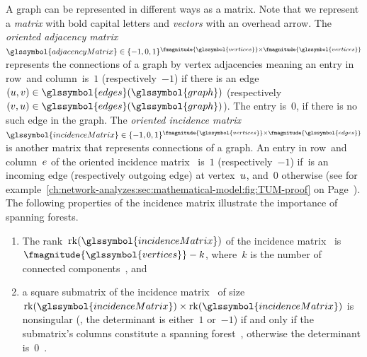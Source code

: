 A graph can be represented in different ways as a matrix. Note that we represent
a \emph{matrix} with bold capital letters and \emph{vectors} with an overhead
arrow. The \emph{oriented adjacency matrix}~$
    \glssymbol{adjacencyMatrix}
    \in
    \{
        -1,0,1
    \}^{
        \fmagnitude{\glssymbol{vertices}}
        \times
        \fmagnitude{\glssymbol{vertices}}
    }
$ represents the connections of a graph by vertex adjacencies meaning an entry
in row~\vertexa and column~\vertexb is~$1$ (respectively~$-1$) if there is an
edge~$(\vertexa,\vertexb)\in\glssymbol{edges}(\glssymbol{graph})$
(respectively~$(\vertexb,\vertexa)\in\glssymbol{edges}(\glssymbol{graph})$). The
entry is~$0$, if there is no such edge in the graph.
% 
The \emph{oriented incidence matrix}~$
    \glssymbol{incidenceMatrix}
    \in
    \{-1,0,1\}^{
        \fmagnitude{\glssymbol{vertices}}
        \times
        \fmagnitude{\glssymbol{edges}}
    }
$ is another matrix that represents connections of a graph. An entry in
row~\vertexa and column~$e$ of the oriented incidence
matrix~ is~$1$ (respectively~$-1$) if~\edge is an
incoming edge (respectively outgoing edge) at vertex~$u$, and~$0$
otherwise (see for
example~\cref{ch:network-analyzes:sec:mathematical-model:fig:TUM-proof} on
Page~\pageref{ch:network-analyzes:sec:mathematical-model:fig:TUM-proof}). The
following properties of the incidence matrix illustrate the importance of
spanning forests.
% 
% 
\begin{enumerate}
\label{ch:foundations:incidence-matrix}
  \item The rank~$\rank(\glssymbol{incidenceMatrix})$ of the incidence
        matrix~ is~$
            \fmagnitude{\glssymbol{vertices}}
            - k
        $, where~$k$ is the number of connected components~\parencite[p.62;
        Theorem 4-3]{Ses61}, and
        \label{ch:foundations:incidence-matrix:property-1}
  \item a square submatrix of the incidence matrix~
        of size~$
            \rank(\glssymbol{incidenceMatrix})
            \times
            \rank(\glssymbol{incidenceMatrix})
        $ is nonsingular (\ie, the determinant is either~$1$ or~$-1$) if and
        only if the submatrix's columns constitute a spanning forest~\forest,
        otherwise the determinant is~$0$~\parencite[p.69; Theorem 4-10]{Ses61}.
        \label{ch:foundations:incidence-matrix:property-2}
\end{enumerate}

